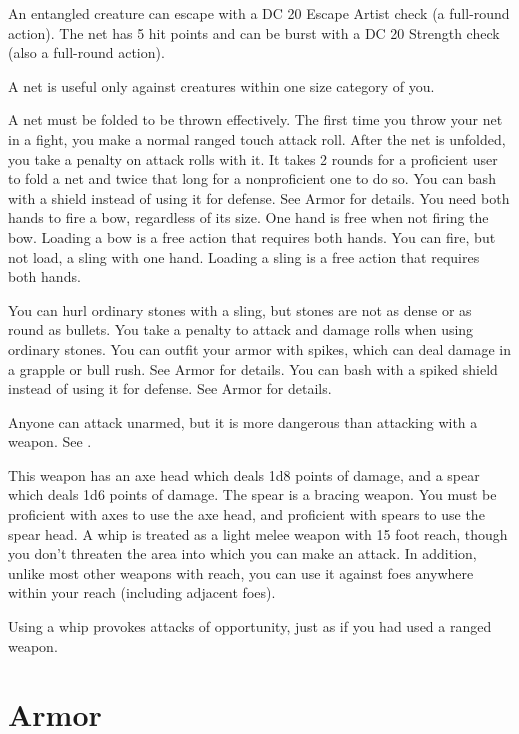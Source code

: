 \par An entangled creature can escape with a DC 20 Escape Artist check (a full-round action). The net has 5 hit points and can be burst with a DC 20 Strength check (also a full-round action).
\par A net is useful only against creatures within one size category of you.
\par A net must be folded to be thrown effectively. The first time you throw your net in a fight, you make a normal ranged touch attack roll. After the net is unfolded, you take a  penalty on attack rolls with it. It takes 2 rounds for a proficient user to fold a net and twice that long for a nonproficient one to do so.
 You can bash with a shield instead of using it for defense. See Armor for details.
 You need both hands to fire a bow, regardless of its size. One hand is free when not firing the bow. Loading a bow is a free action that requires both hands.
 You can fire, but not load, a sling with one hand. Loading a sling is a free action that requires both hands.
\par You can hurl ordinary stones with a sling, but stones are not as dense or as round as bullets. You take a  penalty to attack and damage rolls when using ordinary stones.
 You can outfit your armor with spikes, which can deal damage in a grapple or bull rush. See Armor for details.
 You can bash with a spiked shield instead of using it for defense. See Armor for details.

 Anyone can attack unarmed, but it is more dangerous than attacking with a weapon. See .

 This weapon has an axe head which deals 1d8 points of damage, and a spear which deals 1d6 points of damage. The spear is a bracing weapon. You must be proficient with axes to use the axe head, and proficient with spears to use the spear head.
 A whip is treated as a light melee weapon with 15 foot reach, though you don't threaten the area into which you can make an attack. In addition, unlike most other weapons with reach, you can use it against foes anywhere within your reach (including adjacent foes).
\par Using a whip provokes attacks of opportunity, just as if you had used a ranged weapon.

\section{Armor}


